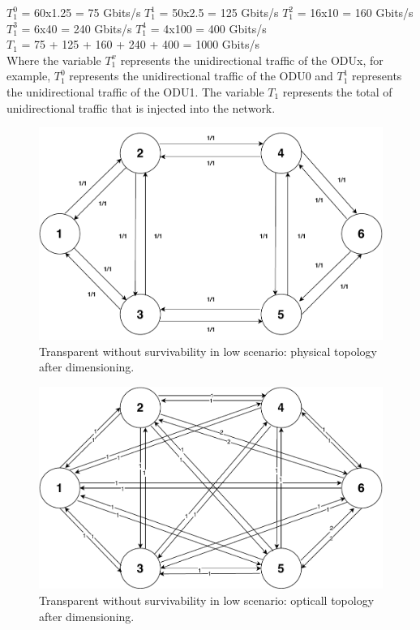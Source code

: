 $T_1^0$ = 60x1.25 = 75 Gbits/s \qquad
$T_1^1$ = 50x2.5 = 125 Gbits/s \qquad
$T_1^2$ = 16x10 = 160 Gbits/s \\

$T_1^3$ = 6x40 = 240 Gbits/s \quad
$T_1^4$ = 4x100 = 400 Gbits/s \\

$T_{1}$ = 75 + 125 + 160 + 240 + 400 = 1000 Gbits/s \qquad \\

Where the variable $T_1^x$ represents the unidirectional traffic of the ODUx, for example, $T_1^0$ represents the unidirectional traffic of the ODU0 and $T_1^1$ represents the unidirectional traffic of the ODU1. The variable $T_{1}$ represents the total of unidirectional traffic that is injected into the network.\\
\begin{figure}[H]
	\centering
	\includegraphics[width=15cm]{sdf/heuristic/transparent/figures/physicalTopology_low_traffic}
	\caption{Transparent without survivability in low scenario: physical topology after dimensioning.}
	\label{physical_topology_low_traffic}
\end{figure}
\begin{figure}[H]
	\centering
	\includegraphics[width=15cm]{sdf/heuristic/transparent/figures/logicalTopology_low_traffic}
	\caption{Transparent without survivability in low scenario: opticall topology after dimensioning.}
\end{figure}

